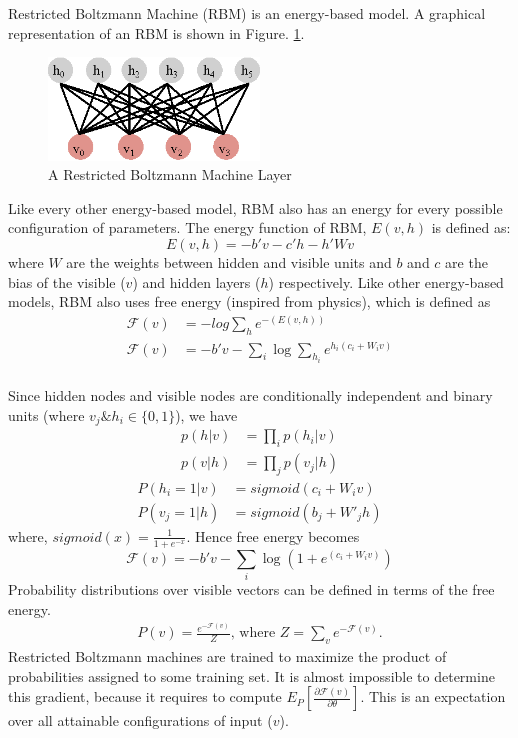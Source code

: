 Restricted Boltzmann Machine (RBM) is an energy-based model. A graphical representation of an RBM is shown in Figure. \ref{fig:rbm_layer}.

\begin{figure}[!ht]
  \centering
  \includegraphics[width=0.5\textwidth]{./imgs/rbm.eps}
  \caption{A Restricted Boltzmann Machine Layer}
  \label{fig:rbm_layer}
\end{figure}%

Like every other energy-based model, RBM also has an energy for every possible configuration of parameters. The energy function of RBM, $E(v,h)$ is defined as: 
$$E(v,h) = - b'v - c'h - h'Wv$$
where $W$ are the weights between hidden and visible units and $b$ and $c$ are the bias of the visible ($v$) and hidden layers ($h$) respectively. Like other energy-based models, RBM also uses free energy (inspired from physics), which is defined as
\begin{align*}
\mathcal{F}(v) &= -log \sum_{h}{e^{-(E(v,h))}} \\
\mathcal{F}(v) &= - b'v - \sum_i \log \sum_{h_i} e^{h_i (c_i + W_i v)}\\
\end{align*}

Since hidden nodes and visible nodes are conditionally independent and binary units (where $v_j \& h_i \in \{0,1\}$), we have 
\begin{align}
p(h|v) &= \prod_i p(h_i|v) \\
p(v|h) &= \prod_j p(v_j|h) 
\end{align}
\begin{align}
P(h_i=1|v) &= sigmoid(c_i + W_i v) \label{eq:rbm_layers_prob1} \\
P(v_j=1|h) &= sigmoid(b_j + W'_j h) \label{eq:rbm_layers_prob2}
\end{align}
where, $sigmoid(x)= \frac{1}{1 + e^{-x}}$. Hence free energy becomes
$$\mathcal{F}(v)= - b'v - \sum_i \log(1 + e^{(c_i + W_i v)})$$ %
Probability distributions over visible vectors can be defined in terms of the free energy.
\begin{align*}
P(v) = \frac{e^{-\mathcal{F}(v)}}{Z} \text{, where } Z=\sum_v e^{-\mathcal{F}(v)}.
\end{align*}
Restricted Boltzmann machines are trained to maximize the product of probabilities assigned to some training set. It is almost impossible to determine this gradient, because it requires to compute $E_P[\frac{\partial \mathcal{F}(v)} {\partial \theta} ]$. This is an expectation over all attainable configurations of input ($v$). \cite{hinton2010practical}

